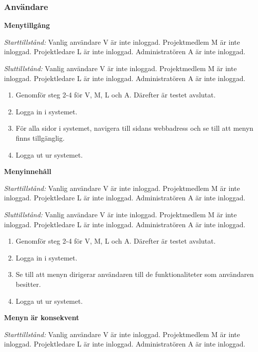 \documentclass[a4paper]{article}
\begin{document}
\subsubsection{Användare}
\begin{FT}
\item \textbf{Menytillgång}

\emph{Starttillstånd:} Vanlig användare V är inte inloggad. Projektmedlem M är inte inloggad. Projektledare L är inte inloggad. Administratören A är inte inloggad.

\emph{Sluttillstånd:} Vanlig användare V är inte inloggad. Projektmedlem M är inte inloggad. Projektledare L är inte inloggad. Administratören A är inte inloggad.

\begin{enumerate}
\item Genomför steg 2-4 för V, M, L och A. Därefter är testet avslutat.
\item Logga in i systemet.
\item För alla sidor i systemet, navigera till sidans webbadress och se till att menyn finns tillgänglig.
\item Logga ut ur systemet.
\end{enumerate}

\item \textbf{Menyinnehåll}

\emph{Starttillstånd:} Vanlig användare V är inte inloggad. Projektmedlem M är inte inloggad. Projektledare L är inte inloggad. Administratören A är inte inloggad.

\emph{Sluttillstånd:} Vanlig användare V är inte inloggad. Projektmedlem M är inte inloggad. Projektledare L är inte inloggad. Administratören A är inte inloggad.

\begin{enumerate}
\item Genomför steg 2-4 för V, M, L och A. Därefter är testet avslutat.
\item Logga in i systemet.
\item Se till att menyn dirigerar användaren till de funktionaliteter som användaren besitter.
\item Logga ut ur systemet.
\end{enumerate}

\item \textbf{Menyn är konsekvent}

\emph{Starttillstånd:} Vanlig användare V är inte inloggad. Projektmedlem M är inte inloggad. Projektledare L är inte inloggad. Administratören A är inte inloggad.


\end{FT}
\end{document}
